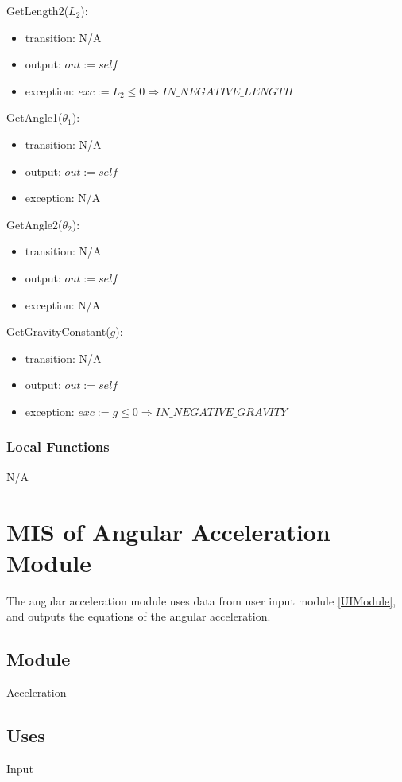 \documentclass[12pt, titlepage]{article}
\begin{document}
\noindent GetLength2($L_2$):
\begin{itemize}
\item transition: N/A
\item output: $out := self$
\item exception: $exc := L_2 \leq 0 \Rightarrow IN\_NEGATIVE\_LENGTH$
\end{itemize}

\noindent GetAngle1($\theta_1$):
\begin{itemize}
\item transition: N/A
\item output: $out := self$
\item exception: N/A
\end{itemize}

\noindent GetAngle2($\theta_2$):
\begin{itemize}
\item transition: N/A
\item output: $out := self$
\item exception: N/A
\end{itemize}


\noindent GetGravityConstant($g$):
\begin{itemize}
\item transition: N/A
\item output: $out := self$
\item exception: $exc := g \leq 0 \Rightarrow IN\_NEGATIVE\_GRAVITY$
\end{itemize}

\subsubsection{Local Functions}
N/A

\newpage


\section{MIS of Angular Acceleration Module} \label{AAModule} 
The angular acceleration module uses data from user input module \ref{UIModule}, and outputs the equations of the angular acceleration. 

\subsection{Module}
Acceleration

\subsection{Uses}
Input
\end{document}
